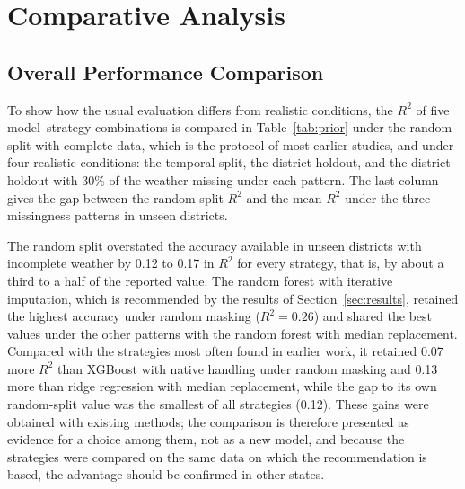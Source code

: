 \section{Comparative Analysis}\label{sec:comp}

\subsection{Overall Performance Comparison}

To show how the usual evaluation differs from realistic conditions, the $R^2$ of five
model--strategy combinations is compared in Table~\ref{tab:prior} under the random split with
complete data, which is the protocol of most earlier studies, and under four realistic
conditions: the temporal split, the district holdout, and the district holdout with 30\% of the
weather missing under each pattern. The last column gives the gap between the random-split $R^2$
and the mean $R^2$ under the three missingness patterns in unseen districts.

\begin{table}[!t]
\caption{$R^2$ Under the Usual Random-Split Protocol and Under Realistic Conditions (Mean Over
Crops; Best per Column in Bold)}\label{tab:prior}
\centering\footnotesize\setlength{\tabcolsep}{2.4pt}


\vspace{2pt}{\scriptsize Temp.: temporal split; Distr.: district holdout; Var.: variable-wise;
Gap: random-split $R^2$ minus the mean $R^2$ of the three missingness columns.}
\end{table}

The random split overstated the accuracy available in unseen districts with incomplete weather by
0.12 to 0.17 in $R^2$ for every strategy, that is, by about a third to a half of the reported
value. The random forest with iterative imputation, which is recommended by the results of
Section~\ref{sec:results}, retained the highest accuracy under random masking ($R^2 = 0.26$) and
shared the best values under the other patterns with the random forest with median replacement.
Compared with the strategies most often found in earlier work, it retained 0.07 more $R^2$ than
XGBoost with native handling under random masking and 0.13 more than ridge regression with median
replacement, while the gap to its own random-split value was the smallest of all strategies (0.12).
These gains were obtained with existing methods; the comparison is therefore presented as evidence
for a choice among them, not as a new model, and because the strategies were compared on the
same data on which the recommendation is based, the advantage should be confirmed in other states.

